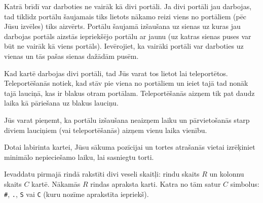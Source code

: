 \documentclass{boi2014-lv}
\newcommand{\constant}[1]{{\tt #1}}
\begin{document}
		Katrā brīdī var darboties ne vairāk kā divi portāli. Ja divi portāli jau darbojas, tad tiklīdz portālu šaujamais tiks lietots nākamo reizi viens no portāliem (pēc Jūsu izvēles) tiks aizvērts. Portālu šaujamā izšaušana uz sienas uz kuras jau darbojas portāls aizstās iepriekšējo portālu ar jaunu (uz katras sienas puses var būt ne vairāk kā viens portāls). Ievērojiet, ka vairāki portāli var darboties uz vienas un tās pašas sienas dažādām pusēm.

		Kad kartē darbojas divi portāli, tad Jūs varat tos lietot lai teleportētos. Teleportēšanās notiek, kad stāv pie viena no portāliem un ieiet tajā tad nonāk tajā lauciņā, kas ir blakus otram portālam. Teleportēšanās aizņem tik pat daudz laika kā pāriešana uz blakus lauciņu.

		Jūs varat pieņemt, ka portālu izšaušana neaizņem laiku un pārvietošanās starp diviem lauciņiem (vai teleportēšanās) aizņem vienu laika vienību.

    \Task
    
		Dotai labirinta kartei, Jūsu sākuma pozīcijai un tortes atrašanās vietai izrēķiniet minimālo nepieciešamo laiku, lai sasniegtu torti.

    \Input
		
		Ievaddatu pirmajā rindā rakstīti divi veseli skaitļi: rindu skaits $R$ un kolonnu skaits $C$ kartē. Nākamās $R$ rindas apraksta karti. Katra no tām satur $C$ simbolus: \constant{\#}, \constant{.}, \constant{S} vai \constant{C} (kuru nozīme aprakstīta iepriekš).
		
\end{document}
